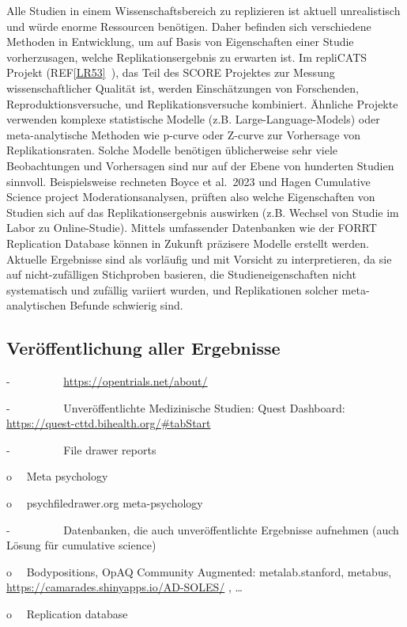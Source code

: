 \documentclass[
  letterpaper,
  DIV=11,
  numbers=noendperiod]{scrreprt}
\begin{document}
Alle Studien in einem Wissenschaftsbereich zu replizieren ist aktuell
unrealistisch und würde enorme Ressourcen benötigen. Daher befinden sich
verschiedene Methoden in Entwicklung, um auf Basis von Eigenschaften
einer Studie vorherzusagen, welche Replikationsergebnis zu erwarten ist.
Im repliCATS Projekt (REF\hyperref[_msocom_53]{{[}LR53{]}}~), das Teil
des SCORE Projektes zur Messung wissenschaftlicher Qualität ist, werden
Einschätzungen von Forschenden, Reproduktionsversuche, und
Replikationsversuche kombiniert. Ähnliche Projekte verwenden komplexe
statistische Modelle (z.B. Large-Language-Models) oder meta-analytische
Methoden wie p-curve oder Z-curve zur Vorhersage von Replikationsraten.
Solche Modelle benötigen üblicherweise sehr viele Beobachtungen und
Vorhersagen sind nur auf der Ebene von hunderten Studien sinnvoll.
Beispielsweise rechneten Boyce et al.~2023 und Hagen Cumulative Science
project Moderationsanalysen, prüften also welche Eigenschaften von
Studien sich auf das Replikationsergebnis auswirken (z.B. Wechsel von
Studie im Labor zu Online-Studie). Mittels umfassender Datenbanken wie
der FORRT Replication Database können in Zukunft präzisere Modelle
erstellt werden. Aktuelle Ergebnisse sind als vorläufig und mit Vorsicht
zu interpretieren, da sie auf nicht-zufälligen Stichproben basieren, die
Studieneigenschaften nicht systematisch und zufällig variiert wurden,
und Replikationen solcher meta-analytischen Befunde schwierig sind.

\subsection{Veröffentlichung aller
Ergebnisse}\label{veruxf6ffentlichung-aller-ergebnisse}

-~~~~~~~~~ \url{https://opentrials.net/about/}

-~~~~~~~~~ Unveröffentlichte Medizinische Studien: Quest Dashboard:
\url{https://quest-cttd.bihealth.org/\#tabStart}

-~~~~~~~~~ File drawer reports

o~~ Meta psychology

o~~ psychfiledrawer.org meta-psychology

-~~~~~~~~~ Datenbanken, die auch unveröffentlichte Ergebnisse aufnehmen
(auch Lösung für cumulative science)

o~~ Bodypositions, OpAQ Community Augmented: metalab.stanford, metabus,
\url{https://camarades.shinyapps.io/AD-SOLES/} , \ldots{}

o~~ Replication database
\end{document}
